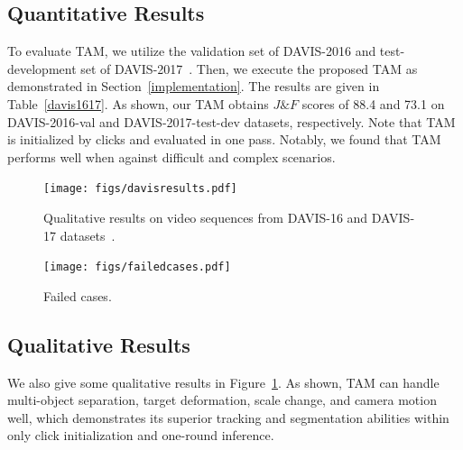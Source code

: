 \documentclass{article}
\begin{document}
\subsection{Quantitative Results}


To evaluate TAM, we utilize the validation set of DAVIS-2016 and test-development set of DAVIS-2017~\cite{davis}.
Then, we execute the proposed TAM as demonstrated in Section~\ref{implementation}.
The results are given in Table~\ref{davis1617}.
As shown, our TAM obtains $J\&F$ scores of 88.4 and 73.1 on DAVIS-2016-val and DAVIS-2017-test-dev datasets, respectively.
Note that TAM is initialized by clicks and evaluated in one pass.
Notably, we found that TAM performs well when against difficult and complex scenarios.




\begin{figure}[t]
\centering
\texttt{[image: figs/davisresults.pdf]}
\caption{Qualitative results on video sequences from DAVIS-16 and DAVIS-17 datasets~\cite{davis}.}
\label{fig:davisresult}
\end{figure}


\begin{figure}[t]
\centering
\texttt{[image: figs/failedcases.pdf]}
\caption{Failed cases.}
\label{fig:failedcases}
\end{figure}

\subsection{Qualitative Results}

We also give some qualitative results in Figure~\ref{fig:davisresult}.
As shown, TAM can handle multi-object separation, target deformation, scale change, and camera motion well, which demonstrates its superior tracking and segmentation abilities within only click initialization and one-round inference.
\end{document}
